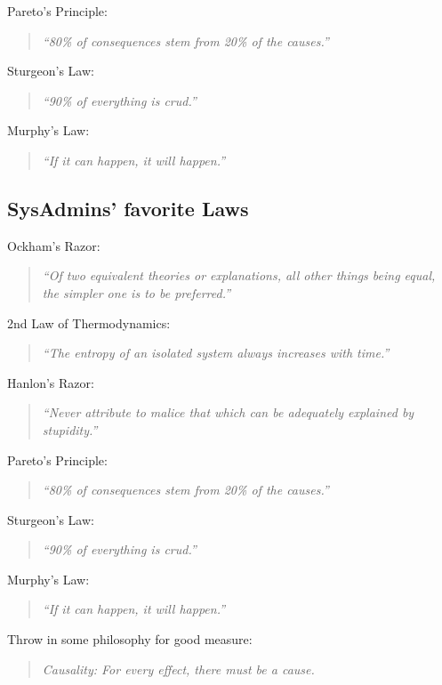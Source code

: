 \documentclass[xga]{xdvislides}
\newcommand{\smallish}{\fontsize{18}{18}\selectfont}
\begin{document}
Pareto's Principle:
\begin{quote}
{\em ``80\% of consequences stem from 20\% of the causes.''}
\end{quote}

Sturgeon's Law:
\begin{quote}
{\em ``90\% of everything is crud.''}
\end{quote}

Murphy's Law:
\begin{quote}
{\em ``If it can happen, it will happen.''}
\end{quote}
\Normalsize


\subsection{SysAdmins' favorite Laws}
\smallish
Ockham's Razor:
\begin{quote}
{\em ``Of two equivalent theories or explanations, all other things being
equal, the simpler one is to be preferred.''}
\end{quote}

2nd Law of Thermodynamics:
\begin{quote}
{\em ``The entropy of an isolated system always increases with time.''}
\end{quote}

Hanlon's Razor:
\begin{quote}
{\em ``Never attribute to malice that which can be adequately explained by
stupidity.''}
\end{quote}

Pareto's Principle:
\begin{quote}
{\em ``80\% of consequences stem from 20\% of the causes.''}
\end{quote}

Sturgeon's Law:
\begin{quote}
{\em ``90\% of everything is crud.''}
\end{quote}

Murphy's Law:
\begin{quote}
{\em ``If it can happen, it will happen.''}
\end{quote}

Throw in some philosophy for good measure:
\begin{quote}
{\em Causality: For every effect, there must be a cause.}
\end{quote}
\Normalsize
\end{document}
